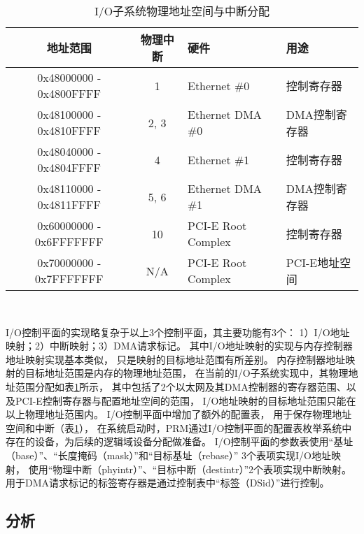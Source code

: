 \begin{table}[b]
  \centering
  \begin{minipage}[t]{0.9\linewidth}
  \caption{I/O子系统物理地址空间与中断分配}
  \label{tab:pard-io-phyconfig}
    \begin{tabular*}{\linewidth}{ccll}
      \toprule[1.5pt]
      \textbf{地址范围} & \textbf{物理中断} & \textbf{硬件} & \textbf{用途} \\
      \midrule[1pt]
      0x48000000 - 0x4800FFFF & 1    & Ethernet \#0       & 控制寄存器    \\
      0x48100000 - 0x4810FFFF & 2, 3 & Ethernet DMA \#0   & DMA控制寄存器 \\
      0x48040000 - 0x4804FFFF & 4    & Ethernet \#1       & 控制寄存器    \\
      0x48110000 - 0x4811FFFF & 5, 6 & Ethernet DMA \#1   & DMA控制寄存器 \\
      0x60000000 - 0x6FFFFFFF & 10   & PCI-E Root Complex & 控制寄存器    \\
      0x70000000 - 0x7FFFFFFF & N/A  & PCI-E Root Complex & PCI-E地址空间 \\
      \bottomrule[1.5pt]
    \end{tabular*}\\[2pt]
  \end{minipage}
\end{table}

I/O控制平面的实现略复杂于以上3个控制平面，其主要功能有3个：
1）I/O地址映射；2）中断映射；3）DMA请求标记。
其中I/O地址映射的实现与内存控制器地址映射实现基本类似，
只是映射的目标地址范围有所差别。
内存控制器地址映射的目标地址范围是内存的物理地址范围，
在当前的I/O子系统实现中，其物理地址范围分配如表\ref{tab:pard-io-phyconfig}所示，
其中包括了2个以太网及其DMA控制器的寄存器范围、以及PCI-E控制寄存器与配置地址空间的范围，
I/O地址映射的目标地址范围只能在以上物理地址范围内。
I/O控制平面中增加了额外的配置表，
用于保存物理地址空间和中断（表\ref{tab:pard-io-phyconfig}），
在系统启动时，PRM通过I/O控制平面的配置表枚举系统中存在的设备，为后续的逻辑域设备分配做准备。
I/O控制平面的参数表使用``基址（base）''、``长度掩码（mask）''和``目标基址（rebase）'' 3个表项实现I/O地址映射，
使用``物理中断（phyintr）''、``目标中断（destintr）''2个表项实现中断映射。
用于DMA请求标记的标签寄存器是通过控制表中``标签（DSid）''进行控制。


\subsection{分析}

